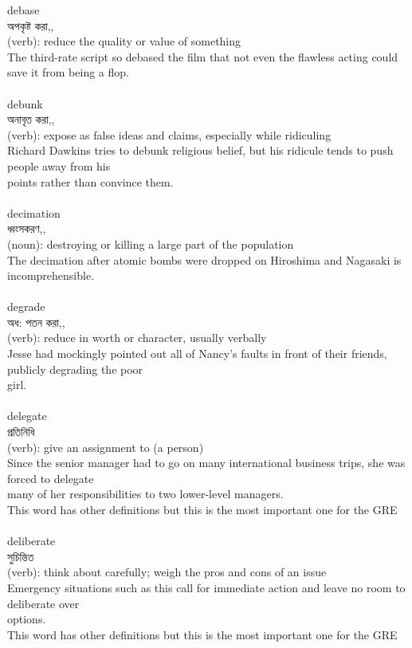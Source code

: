 \documentclass{article}
\begin{document}
{debase}\\
{অপকৃষ্ট করা,,}\\
{(verb): reduce the quality or value of something\\The third-rate script so debased the film that not even the flawless acting could save it from being a flop.\\}\\
{debunk}\\
{অনাবৃত করা,,}\\
{(verb): expose as false ideas and claims, especially while ridiculing\\Richard Dawkins tries to debunk religious belief, but his ridicule tends to push people away from his\\points rather than convince them.\\}\\
{decimation}\\
{ধ্বংসকরণ,,}\\
{(noun): destroying or killing a large part of the population\\The decimation after atomic bombs were dropped on Hiroshima and Nagasaki is incomprehensible.\\}\\
{degrade}\\
{অধ: পতন করা,,}\\
{(verb): reduce in worth or character, usually verbally\\Jesse had mockingly pointed out all of Nancy's faults in front of their friends, publicly degrading the poor\\girl.\\}\\
{delegate}\\
{প্রতিনিধি}\\
{(verb): give an assignment to (a person)\\Since the senior manager had to go on many international business trips, she was forced to delegate\\many of her responsibilities to two lower-level managers.\\This word has other definitions but this is the most important one for the GRE\\}\\
{deliberate}\\
{সুচিন্তিত}\\
{(verb): think about carefully; weigh the pros and cons of an issue\\Emergency situations such as this call for immediate action and leave no room to deliberate over\\options.\\This word has other definitions but this is the most important one for the GRE\\}\\
\end{document}

